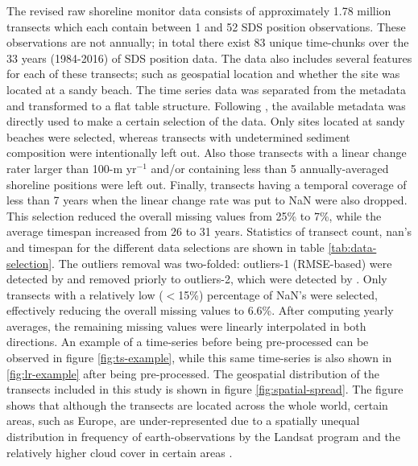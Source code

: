 \documentclass[format=sigconf, review=false, screen=true]{acmart}
\begin{document}
The revised raw shoreline monitor data consists of approximately 1.78 million transects which each contain between 1 and 52 SDS position observations. These observations are not annually; in total there exist 83 unique time-chunks over the 33 years (1984-2016) of SDS position data. The data also includes several features for each of these transects; such as geospatial location and whether the site was located at a sandy beach. The time series data was separated from the metadata and transformed to a flat table structure. Following \citet{Kras2019shoreline}, the available metadata was directly used to make a certain selection of the data. Only sites located at sandy beaches were selected, whereas transects with undetermined sediment composition were intentionally left out. Also those transects with a linear change rater larger than 100-m yr$^{-1}$ and/or containing less than 5 annually-averaged shoreline positions were left out. Finally, transects having a temporal coverage of less than 7 years when the linear change rate was put to NaN were also dropped. This selection reduced the overall missing values from 25\% to 7\%, while the average timespan increased from 26 to 31 years. Statistics of transect count, nan's and timespan for the different data selections are shown in table \ref{tab:data-selection}. The outliers removal was two-folded: outliers-1 (RMSE-based) were detected by \citet{Luijendijk2018state} and removed priorly to outliers-2, which were detected by \citet{Kras2019shoreline}. Only transects with a relatively low ($<$15\%) percentage of NaN's were selected, effectively reducing the overall missing values to 6.6\%. After computing yearly averages, the remaining missing values were linearly interpolated in both directions. An example of a time-series before being pre-processed can be observed in figure \ref{fig:ts-example}, while this same time-series is also shown in \ref{fig:lr-example} after being pre-processed. The geospatial distribution of the transects included in this study is shown in figure \ref{fig:spatial-spread}. The figure shows that although the transects are located across the whole world, certain areas, such as Europe, are under-represented due to a spatially unequal distribution in frequency of earth-observations by the Landsat program \citep{wulder2016global} and the relatively higher cloud cover in certain areas \citep{garcia2008spatial}.    
\end{document}
